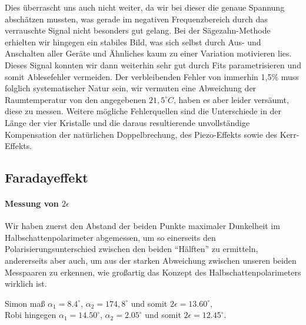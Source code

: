  Dies überrascht uns auch nicht weiter, da wir bei dieser die genaue Spannung abschätzen mussten, was gerade im negativen Frequenzbereich durch das verrauschte Signal nicht besonders gut gelang. Bei der Sägezahn-Methode erhielten wir hingegen ein stabiles Bild, was sich selbst durch Aus- und Anschalten aller Geräte und Ähnliches kaum zu einer Variation motivieren lies. Dieses Signal konnten wir dann weiterhin sehr gut durch Fits parametrisieren und somit Ablesefehler vermeiden. Der verbleibenden Fehler von immerhin 1,5\% muss folglich systematischer Natur sein, wir vermuten eine Abweichung der Raumtemperatur von den angegebenen $21,5^\circ C$, haben es aber leider versäumt, diese zu messen. Weitere mögliche Fehlerquellen sind die Unterschiede in der Länge der vier Kristalle und die daraus resultierende unvollständige Kompensation der natürlichen Doppelbrechung, des Piezo-Effekts sowie des Kerr-Effekts.


\subsection{Faradayeffekt}

\paragraph{Messung von $2\epsilon$}
Wir haben zuerst den Abstand der beiden Punkte maximaler Dunkelheit im Halbschattenpolarimeter abgemessen, um so einerseits den Polarisierungsunterschied zwischen den beiden "`Hälften"' zu ermitteln, andererseits aber auch, um aus der starken Abweichung zwischen unseren beiden Messpaaren zu erkennen, wie großartig das Konzept des Halbschattenpolarimeters wirklich ist.

Simon maß $\alpha_1 = 8.4^\circ$, $\alpha_2 = 174,8^\circ$ und somit $ 2\epsilon = 13.60^\circ $,\\ Robi hingegen $\alpha_1 = 14.50^\circ$, $\alpha_2 = 2.05^\circ$ und somit $ 2\epsilon = 12.45^\circ $.

\newcommand{\faradayDesc}{
Wir berechnen das Magnetfeld auf der Achse:

und integrieren darüber
$\int H dl$

Vergleich mit $ H = \frac{N I}{l} $

Berechnen die Verdetkonstante

$$ \alpha = l V H $$

Wir führen eine lineare Regression durch und erhalten die Steigung $a$ und den Achsenabschnitt $b$.

Es gilt $$ \alpha = V \int H(z) dz= V 2556 I = a I + b $$

Der Achsenabschnitt $b$ enthält den Offset bei der Winkelmessung und ist nicht weiter von Bedeutung.

Somit erhalten wir die Verdetkonstante aus $$ V = \frac{a}{2556} $$  

}

